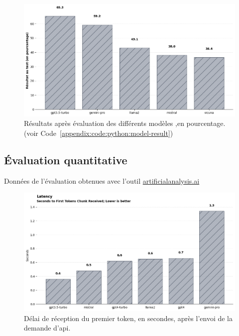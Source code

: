 \begin{figure}[H]
    \centering
    \includegraphics[width=15cm]{gfx/fig-model-result.png}
    \caption{Résultats après évaluation des différents modèles ,en pourcentage. (voir Code~\ref{appendix:code:python:model-result})}
    \label{fig:model-result}
\end{figure}

\newpage
\subsection{Évaluation quantitative}
Données de l'évaluation obtenues avec l'outil \href{https://artificialanalysis.ai/models/gemini-pro/prompt-options/single/medium}{artificialanalysis.ai}

\begin{figure}[H]
    \centering
    \includegraphics[width=15cm]{gfx/fig-latency-eval.png}
    \caption{Délai de réception du premier token, en secondes, après l'envoi de la demande d'\ac{api}.}
    \label{fig:model-latency-eval}
\end{figure}

